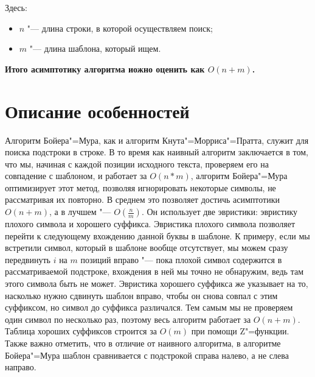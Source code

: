 \documentclass[otchet]{../SCWorks}
\begin{document}
Здесь:
\begin{itemize}
	\item[$\bullet$] $n$ "--- длина строки, в которой осуществляем поиск;
	\item[$\bullet$] $m$ "--- длина шаблона, который ищем.
\end{itemize}

\textbf{Итого асимптотику алгоритма иожно оценить как $O(n + m)$.}

\section{Описание особенностей}

Алгоритм Бойера"=Мура, как и алгоритм Кнута"=Морриса"=Пратта, служит для поиска подстроки в строке. В то время как наивный алгоритм заключается в том, что мы, начиная с каждой позиции исходного текста, проверяем его на совпадение с шаблоном, и работает за $O(n * m)$, алгоритм Бойера"=Мура оптимизирует этот метод, позволяя игнорировать некоторые символы, не рассматривая их повторно. В среднем это позволяет достичь асимптотики $O(n + m)$, а в лучшем "--- $O(\frac{n}{m})$. Он использует две эвристики: эвристику плохого символа и хорошего суффикса. Эвристика плохого символа позволяет перейти к следующему вхождению данной буквы в шаблоне. К примеру, если мы встретили символ, который в шаблоне вообще отсутствует, мы можем сразу передвинуть $i$ на $m$ позиций вправо "--- пока плохой символ содержится в рассматриваемой подстроке, вхождения в ней мы точно не обнаружим, ведь там этого символа быть не может. Эвристика хорошего суффикса же указывает на то, насколько нужно сдвинуть шаблон вправо, чтобы он снова совпал с этим суффиксом, но символ до суффикса различался. Тем самым мы не проверяем один символ по несколько раз, поэтому весь алгоритм работает за $O(n + m)$. Таблица хороших суффиксов строится за $O(m)$ при помощи Z"=функции. Также важно отметить, что в отличие от наивного алгоритма, в алгоритме Бойера"=Мура шаблон сравнивается с подстрокой справа налево, а не слева направо.







\appendix
\end{document}

